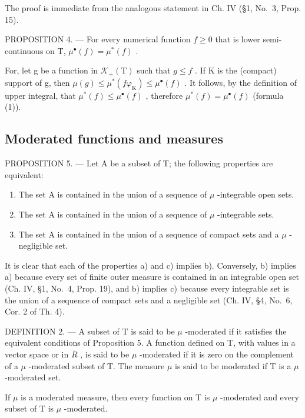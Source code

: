 The proof is immediate from the analogous statement in Ch. IV (§1, No.~3, Prop. 15).

PROPOSITION 4. --- For every numerical function \(f \geqslant 0\) that is lower semi-continuous on T, \(\mu^{\bullet}(f) = \mu^{*}(f)\) .

For, let g be a function in \(\mathcal{K}_{+}(\mathrm{T})\) such that \(g \leqslant f\) . If K is the (compact) support of g, then \(\mu(g) \leqslant \mu^{*}(f\varphi_{\mathrm{K}}) \leqslant \mu^{\bullet}(f)\) . It follows, by the definition of upper integral, that \(\mu^{*}(f) \leqslant \mu^{\bullet}(f)\) , therefore \(\mu^{*}(f) = \mu^{\bullet}(f)\) (formula (1)).

\subsection{Moderated functions and measures}

PROPOSITION 5. --- Let A be a subset of T; the following properties are equivalent:

\begin{enumerate}
\def\labelenumi{\alph{enumi})}
\item
  The set A is contained in the union of a sequence of \(\mu\) -integrable open sets.
\item
  The set A is contained in the union of a sequence of \(\mu\) -integrable sets.
\item
  The set A is contained in the union of a sequence of compact sets and a \(\mu\) -negligible set.
\end{enumerate}

It is clear that each of the properties a) and c) implies b). Conversely, b) implies a) because every set of finite outer measure is contained in an integrable open set (Ch. IV, §1, No.~4, Prop. 19), and b) implies c) because every integrable set is the union of a sequence of compact sets and a negligible set (Ch. IV, §4, No.~6, Cor. 2 of Th. 4).

DEFINITION 2. --- A subset of T is said to be \(\mu\) -moderated if it satisfies the equivalent conditions of Proposition 5. A function defined on T, with values in a vector space or in \(\overline{R}\) , is said to be \(\mu\) -moderated if it is zero on the complement of a \(\mu\) -moderated subset of T. The measure \(\mu\) is said to be moderated if T is a \(\mu\) -moderated set.

If \(\mu\) is a moderated measure, then every function on T is \(\mu\) -moderated and every subset of T is \(\mu\) -moderated.

